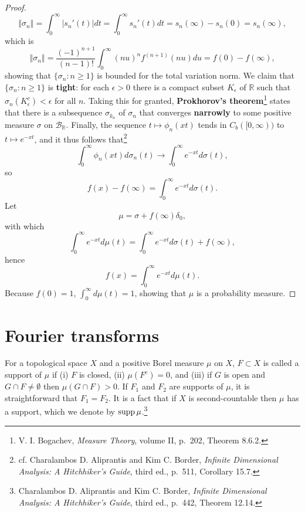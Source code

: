 \documentclass{article}
\newcommand{\supp}{\ensuremath\mathrm{supp}\,}
\newcommand{\norm}[1]{\left\Vert #1 \right\Vert}
\theoremstyle{definition}
\theoremstyle{definition}
\begin{document}
\begin{proof}
\[
\norm{\sigma_n} = \int_0^\infty |s_n'(t)| dt =  \int_0^\infty s_n'(t) dt 
=s_n(\infty) - s_n(0) = s_n(\infty),
\]
which is
\[
\norm{\sigma_n} = \frac{(-1)^{n+1}}{(n-1)!} \int_0^\infty (nu)^n f^{(n+1)}(nu) du
=f(0)-f(\infty),
\]
showing that $\{\sigma_n: n \geq 1\}$ is bounded for the total variation norm. 
We claim that $\{\sigma_n: n \geq 1\}$ is \textbf{tight}: for each $\epsilon>0$ there is a compact subset
$K_\epsilon$ of $\mathbb{R}$ such that $\sigma_n(K_\epsilon^c)<\epsilon$ for all $n$. 
Taking this for granted, \textbf{Prokhorov's theorem}\footnote{V. I. Bogachev, {\em Measure Theory},
volume II, p.~202, Theorem 8.6.2.} states that there is a subsequence
$\sigma_{k_n}$ of $\sigma_n$  that converges \textbf{narrowly} to some positive measure $\sigma$ on
$\mathscr{B}_{\mathbb{R}}$. Finally, the sequence
$t \mapsto \phi_n(xt)$ tends in $C_b([0,\infty))$ to $t \mapsto e^{-xt}$, and it thus follows that\footnote{cf. Charalambos D. Aliprantis
and Kim C. Border, {\em Infinite Dimensional Analysis: A Hitchhiker's Guide}, third ed., p.~511, Corollary 15.7.}
\[
\int_0^\infty \phi_n(xt) d\sigma_n(t) \to \int_0^\infty e^{-xt} d\sigma(t),
\]
so
\[
f(x)-f(\infty) =  \int_0^\infty e^{-xt} d\sigma(t).
\]
Let
\[
\mu=\sigma+f(\infty) \delta_0,
\]
with which
\[
 \int_0^\infty e^{-xt} d\mu(t) =  \int_0^\infty e^{-xt} d\sigma(t) + f(\infty),
\]
hence 
\[
f(x) =  \int_0^\infty e^{-xt} d\mu(t).
\]
Because $f(0)=1$, $\int_0^\infty d\mu(t)=1$, showing that $\mu$ is a probability measure.
\end{proof}


\section{Fourier transforms}
For a topological space $X$ and a positive Borel measure $\mu$ on $X$, 
$F \subset X$ is called a support of $\mu$ if (i) $F$ is closed, 
(ii) $\mu(F^c)=0$, and (iii) if $G$ is open and $G \cap F \neq \emptyset$ then
$\mu(G \cap F)>0$.
 If $F_1$ and $F_2$ are supports of $\mu$, it is straightforward that $F_1=F_2$.
 It is a fact that if $X$ is second-countable then $\mu$ has a support, which we denote by
 $\supp \mu$.\footnote{Charalambos D. Aliprantis
and Kim C. Border, {\em Infinite Dimensional Analysis: A Hitchhiker's Guide}, third ed., p.~442, Theorem 12.14.}
\end{document}
